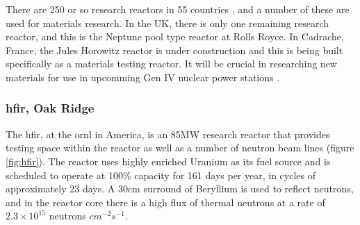 There are 250 or so research reactors in 55 countries \cite{researchreactorstats}, and a number of these are used for materials research.  In the UK, there is only one remaining research reactor, and this is the Neptune pool type reactor at Rolls Royce\cite{neptunereactor}.  In Cadrache, France, the Jules Horowitz reactor is under construction and this is being built specifically as a materials testing reactor.  It will be crucial in researching new materials for use in upcomming Gen IV nuclear power stations \cite{researchreactorstats}.  


\FloatBarrier
\subsubsection{\acrlong{hfir}, Oak Ridge}

The \acrlong{hfir}, at the \acrlong{ornl} in America, is an 85MW research reactor that provides testing space within the reactor as well as a number of neutron beam lines (figure \ref{fig:hfir}).  The reactor uses highly enriched Uranium as its fuel source and is scheduled to operate at 100\% capacity for 161 days per year, in cycles of approximately 23 days.  A 30cm surround of Beryllium is used to reflect neutrons, and in the reactor core there is a high flux of thermal neutrons at a rate of $2.3 \times 10^{15}$ neutrons $cm^{-2} s^{-1}$\cite{hfirornluserguide}.



